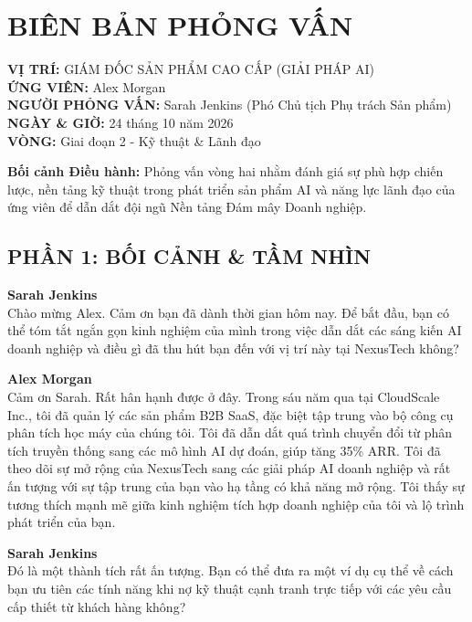 \section*{BIÊN BẢN PHỎNG VẤN}

\noindent\textbf{VỊ TRÍ:} GIÁM ĐỐC SẢN PHẨM CAO CẤP (GIẢI PHÁP AI) \\
\textbf{ỨNG VIÊN:} Alex Morgan \\
\textbf{NGƯỜI PHỎNG VẤN:} Sarah Jenkins (Phó Chủ tịch Phụ trách Sản phẩm) \\
\textbf{NGÀY \& GIỜ:} 24 tháng 10 năm 2026 \\
\textbf{VÒNG:} Giai đoạn 2 - Kỹ thuật \& Lãnh đạo

\vspace{0.5em}
\noindent\textbf{Bối cảnh Điều hành:} Phỏng vấn vòng hai nhằm đánh giá sự phù hợp chiến lược, nền tảng kỹ thuật trong phát triển sản phẩm AI và năng lực lãnh đạo của ứng viên để dẫn dắt đội ngũ Nền tảng Đám mây Doanh nghiệp.

\subsection*{PHẦN 1: BỐI CẢNH \& TẦM NHÌN}

\noindent\textbf{Sarah Jenkins} \\
Chào mừng Alex. Cảm ơn bạn đã dành thời gian hôm nay. Để bắt đầu, bạn có thể tóm tắt ngắn gọn kinh nghiệm của mình trong việc dẫn dắt các sáng kiến AI doanh nghiệp và điều gì đã thu hút bạn đến với vị trí này tại NexusTech không?

\vspace{0.5em}
\noindent\textbf{Alex Morgan} \\
Cảm ơn Sarah. Rất hân hạnh được ở đây. Trong sáu năm qua tại CloudScale Inc., tôi đã quản lý các sản phẩm B2B SaaS, đặc biệt tập trung vào bộ công cụ phân tích học máy của chúng tôi. Tôi đã dẫn dắt quá trình chuyển đổi từ phân tích truyền thống sang các mô hình AI dự đoán, giúp tăng 35\% ARR. Tôi đã theo dõi sự mở rộng của NexusTech sang các giải pháp AI doanh nghiệp và rất ấn tượng với sự tập trung của bạn vào hạ tầng có khả năng mở rộng. Tôi thấy sự tương thích mạnh mẽ giữa kinh nghiệm tích hợp doanh nghiệp của tôi và lộ trình phát triển của bạn.

\vspace{0.5em}
\noindent\textbf{Sarah Jenkins} \\
Đó là một thành tích rất ấn tượng. Bạn có thể đưa ra một ví dụ cụ thể về cách bạn ưu tiên các tính năng khi nợ kỹ thuật cạnh tranh trực tiếp với các yêu cầu cấp thiết từ khách hàng không?


